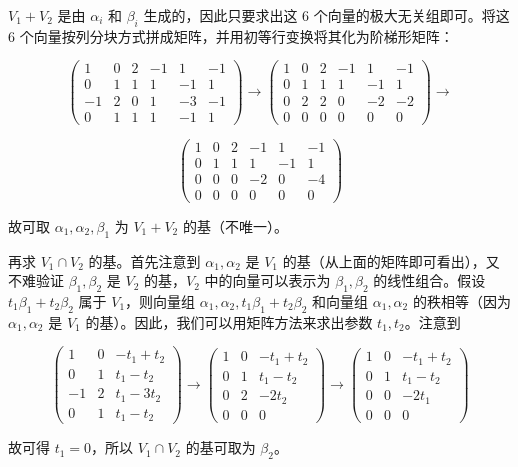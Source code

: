 \documentclass[lang=cn,12pt]{elegantbook}
\begin{document}
\begin{solution}[解法 1]
    \(V_1 + V_2\) 是由 \(\alpha_i\) 和 \(\beta_i\) 生成的，因此只要求出这 6 个向量的极大无关组即可。将这 6 个向量按列分块方式拼成矩阵，并用初等行变换将其化为阶梯形矩阵：
    
    \[
\begin{pmatrix}
    1 & 0 & 2 & -1 & 1 & -1 \\
    0 & 1 & 1 & 1 & -1 & 1 \\
    -1 & 2 & 0 & 1 & -3 & -1 \\
    0 & 1 & 1 & 1 & -1 & 1
\end{pmatrix} \rightarrow 
\begin{pmatrix}
    1 & 0 & 2 & -1 & 1 & -1 \\
    0 & 1 & 1 & 1 & -1 & 1 \\
    0 & 2 & 2 & 0 & -2 & -2 \\
    0 & 0 & 0 & 0 & 0 & 0
\end{pmatrix} \rightarrow
    \]
    
    \[
\begin{pmatrix}
    1 & 0 & 2 & -1 & 1 & -1 \\
    0 & 1 & 1 & 1 & -1 & 1 \\
    0 & 0 & 0 & -2 & 0 & -4 \\
    0 & 0 & 0 & 0 & 0 & 0
\end{pmatrix}
    \]
    
    故可取 \(\alpha_1, \alpha_2, \beta_1\) 为 \(V_1 + V_2\) 的基（不唯一）。
    
    再求 \(V_1 \cap V_2\) 的基。首先注意到 \(\alpha_1, \alpha_2\) 是 \(V_1\) 的基（从上面的矩阵即可看出），又不难验证 \(\beta_1, \beta_2\) 是 \(V_2\) 的基，\(V_2\) 中的向量可以表示为 \(\beta_1, \beta_2\) 的线性组合。假设 \(t_1 \beta_1 + t_2 \beta_2\) 属于 \(V_1\)，则向量组 \(\alpha_1, \alpha_2, t_1 \beta_1 + t_2 \beta_2\) 和向量组 \(\alpha_1, \alpha_2\) 的秩相等（因为 \(\alpha_1, \alpha_2\) 是 \(V_1\) 的基）。因此，我们可以用矩阵方法来求出参数 \(t_1, t_2\)。注意到
    
    \[
\begin{pmatrix}
    1 & 0 & -t_1 + t_2 \\
    0 & 1 & t_1 - t_2 \\
    -1 & 2 & t_1 - 3t_2 \\
    0 & 1 & t_1 - t_2
\end{pmatrix} \rightarrow 
\begin{pmatrix}
    1 & 0 & -t_1 + t_2 \\
    0 & 1 & t_1 - t_2 \\
    0 & 2 & -2t_2 \\
    0 & 0 & 0
\end{pmatrix} \rightarrow 
\begin{pmatrix}
    1 & 0 & -t_1 + t_2 \\
    0 & 1 & t_1 - t_2 \\
    0 & 0 & -2t_1 \\
    0 & 0 & 0
\end{pmatrix}
    \]
    
    故可得 \(t_1 = 0\)，所以 \(V_1 \cap V_2\) 的基可取为 \(\beta_2\)。
\end{solution}
    
\end{document}
